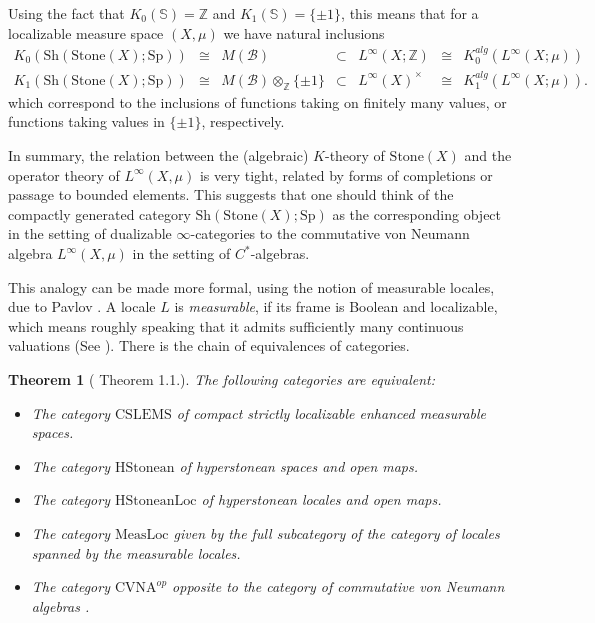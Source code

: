 \documentclass[10pt]{amsart}
\newtheorem{theorem}{Theorem}[section]
\theoremstyle{definition}
\begin{document}
Using the fact that $K_0(\mathbb{S}) = \mathbb{Z}$ and $K_1(\mathbb{S}) = \{\pm 1\}$, this means that for a localizable measure space $(X,\mu)$ we have natural inclusions
$$\begin{array}{rcccccl} K_0( \mathrm{Sh}(\mathrm{Stone}(X);\mathrm{Sp}) ) &\cong & M(\mathcal{B}) &\subset & L^\infty(X; \mathbb{Z})  &\cong & K^{alg}_0( L^\infty(X;\mu) )  \\
K_1( \mathrm{Sh}(\mathrm{Stone}(X);\mathrm{Sp}) ) & \cong & M(\mathcal{B}) \otimes_\mathbb{Z} \{\pm 1\} & \subset & L^\infty(X)^\times &\cong & K^{alg}_1( L^\infty(X;\mu) ).
\end{array}$$
which correspond to the inclusions of functions taking on finitely many values, or functions taking values in $\{\pm 1\}$, respectively.

In summary, the relation between the (algebraic) $K$-theory of $\mathrm{Stone}(X)$ and the operator theory of $L^\infty(X,\mu)$ is very tight, related by forms of completions or passage to bounded elements. This suggests that one should think of the compactly generated category  $\mathrm{Sh}(\mathrm{Stone}(X);\mathrm{Sp})$ as the corresponding object in the setting of dualizable $\infty$-categories to the commutative von Neumann algebra $L^\infty(X,\mu)$ in the setting of $C^*$-algebras.

This analogy can be made more formal, using the notion of measurable locales, due to Pavlov \cite{Pavlov_2022}. A locale $L$ is \emph{measurable}, if its frame is Boolean and localizable, which means roughly speaking that it admits sufficiently many continuous valuations (See \cite[Definition 2.52]{Pavlov_2022}). There is the chain of equivalences of categories.
\begin{theorem}[\cite{Pavlov_2022} Theorem 1.1.]
The following categories are equivalent:
\begin{itemize}
\item The category $\mathrm{CSLEMS}$ of compact strictly localizable enhanced measurable spaces.
\item The category $\mathrm{HStonean}$ of hyperstonean spaces and open maps.
\item The category $\mathrm{HStoneanLoc}$ of hyperstonean locales and open maps.
\item The category $\mathrm{MeasLoc}$ given by the full subcategory of the category of locales spanned by the measurable locales.
\item The category $\mathrm{CVNA}^{op}$ opposite to the category of commutative von Neumann algebras .
\end{itemize}
\end{theorem}
\end{document}
